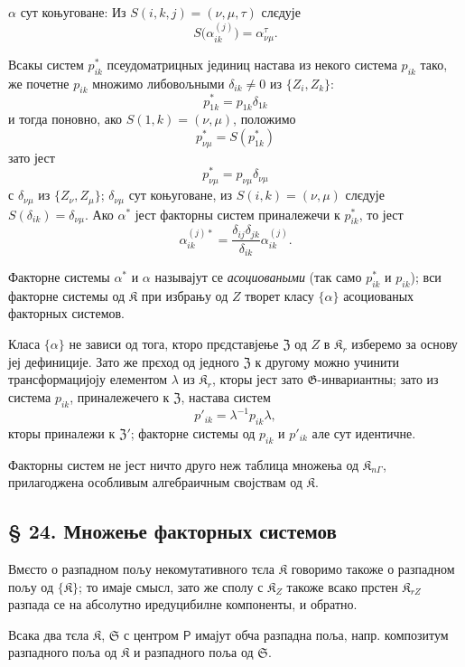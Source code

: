 \documentclass[11pt]{article}
\begin{document}
\(\alpha\) сут коњуговане: Из \(S(i,k,j)=(\nu,\mu,\tau)\) слєдује
\[
S\bigl(\alpha_{ik}^{(j)}\bigr)=\alpha_{\nu\mu}^{\tau}.
\]

Всакы систем \(p_{ik}^*\) псеудоматрицных јединиц настава из некого система \(p_{ik}\) тако, же почетне \(p_{ik}\) множимо либовољными \(\delta_{ik}\ne0\) из \(\{Z_i,Z_k\}\):
\[
p_{1k}^*=p_{1k}\delta_{1k}
\]
и тогда поновно, ако \(S(1,k)=(\nu,\mu)\), положимо
\[
p_{\nu\mu}^*=S(p_{1k}^*)
\]
зато јест
\[
p_{\nu\mu}^*=p_{\nu\mu}\delta_{\nu\mu}
\]
с \(\delta_{\nu\mu}\) из \(\{Z_\nu,Z_\mu\}\); \(\delta_{\nu\mu}\) сут коњуговане, из \(S(i,k)=(\nu,\mu)\) слєдује \(S(\delta_{ik})=\delta_{\nu\mu}\). Ако \(\alpha^*\) јест факторны систем приналежечи к \(p_{ik}^*\), то јест
\[
\alpha_{ik}^{(j)*}=\frac{\delta_{ij}\delta_{jk}}{\delta_{ik}}\alpha_{ik}^{(j)}.
\]

Факторне системы \(\alpha^*\) и \(\alpha\) называјут се \emph{асоциоваными} (так само \(p_{ik}^*\) и \(p_{ik}\)); вси факторне системы од \(\mathfrak K\) при избрању од \(Z\) творет класу \(\{\alpha\}\) асоциованых факторных системов.

Класа \(\{\alpha\}\) не зависи од тога, кторо прєдставјење \(\mathfrak Z\) од \(Z\) в \(\mathfrak K_r\) изберемо за основу јеј дефиниције. Зато же прєход од једного \(\mathfrak Z\) к другому можно учинити трансформацијоју елементом \(\lambda\) из \(\mathfrak K_r\), кторы јест зато \(\mathfrak G\)-инвариантны; зато из система \(p_{ik}\), приналежечего к \(\mathfrak Z\), настава систем
\[
p'_{ik}=\lambda^{-1}p_{ik}\lambda,
\]
кторы приналежи к \(\mathfrak Z'\); факторне системы од \(p_{ik}\) и \(p'_{ik}\) але сут идентичне.

Факторны систем не јест ничто друго неж таблица множења од \(\mathfrak K_{n\Gamma}\), прилагоджена особливым алгебраичным својствам од \(\mathfrak K\).

\subsection*{§ 24. Множење факторных системов}\label{multiplikation-von-faktorensystemen}

Вмєсто о разпадном пољу некомутативного тєла \(\mathfrak K\) говоримо такоже о разпадном пољу од \(\{\mathfrak K\}\); то имаје смысл, зато же сполу с \(\mathfrak K_Z\) такоже всако прстен \(\mathfrak K_{rZ}\) разпада се на абсолутно иредуцибилне компоненты, и обратно.

Всака два тєла \(\mathfrak K\), \(\mathfrak S\) с центром \(\mathsf P\) имајут обча разпадна поља, напр. композитум разпадного поља од \(\mathfrak K\) и разпадного поља од \(\mathfrak S\).
\end{document}

